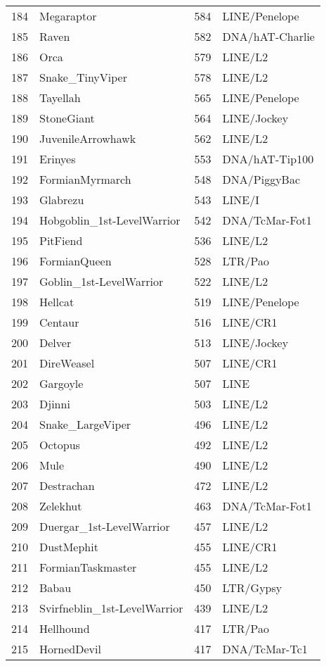 \begin{table}[ht]
\begin{tabular}{rlrl}
  184 & Megaraptor & 584 & LINE/Penelope  \\ 
  185 & Raven & 582 & DNA/hAT-Charlie  \\ 
  186 & Orca & 579 & LINE/L2  \\ 
  187 & Snake\_TinyViper & 578 & LINE/L2  \\ 
  188 & Tayellah & 565 & LINE/Penelope  \\ 
  189 & StoneGiant & 564 & LINE/Jockey  \\ 
  190 & JuvenileArrowhawk & 562 & LINE/L2  \\ 
  191 & Erinyes & 553 & DNA/hAT-Tip100  \\ 
  192 & FormianMyrmarch & 548 & DNA/PiggyBac  \\ 
  193 & Glabrezu & 543 & LINE/I  \\ 
  194 & Hobgoblin\_1st-LevelWarrior & 542 & DNA/TcMar-Fot1  \\ 
  195 & PitFiend & 536 & LINE/L2  \\ 
  196 & FormianQueen & 528 & LTR/Pao  \\ 
  197 & Goblin\_1st-LevelWarrior & 522 & LINE/L2  \\ 
  198 & Hellcat & 519 & LINE/Penelope  \\ 
  199 & Centaur & 516 & LINE/CR1  \\ 
  200 & Delver & 513 & LINE/Jockey  \\ 
  201 & DireWeasel & 507 & LINE/CR1  \\ 
  202 & Gargoyle & 507 & LINE  \\ 
  203 & Djinni & 503 & LINE/L2  \\ 
  204 & Snake\_LargeViper & 496 & LINE/L2  \\ 
  205 & Octopus & 492 & LINE/L2  \\ 
  206 & Mule & 490 & LINE/L2  \\ 
  207 & Destrachan & 472 & LINE/L2  \\ 
  208 & Zelekhut & 463 & DNA/TcMar-Fot1  \\ 
  209 & Duergar\_1st-LevelWarrior & 457 & LINE/L2  \\ 
  210 & DustMephit & 455 & LINE/CR1  \\ 
  211 & FormianTaskmaster & 455 & LINE/L2  \\ 
  212 & Babau & 450 & LTR/Gypsy  \\ 
  213 & Svirfneblin\_1st-LevelWarrior & 439 & LINE/L2  \\ 
  214 & Hellhound & 417 & LTR/Pao  \\ 
  215 & HornedDevil & 417 & DNA/TcMar-Tc1  \\ 

\end{tabular}
\end{table}
